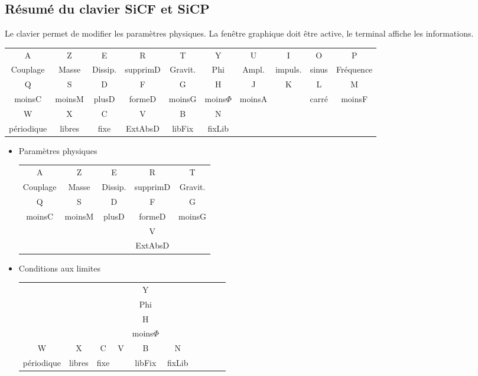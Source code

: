\subsection{Résumé du clavier SiCF et SiCP}
%
Le clavier permet de modifier les paramètres physiques. La fenêtre graphique doit être active, le terminal affiche les informations.
%
%
\footnotesize
\begin{center}
\begin{tabular}{cccccccccc}
\sf A &\sf Z &\sf E &\sf R &\sf T &\sf Y &\sf U &\sf I &\sf O &\sf P \\
Couplage & Masse & Dissip. & supprimD & Gravit. & Phi & Ampl. & impuls. & sinus & Fréquence \\
\sf Q &\sf S &\sf D &\sf F &\sf G &\sf H &\sf J &\sf K &\sf L &\sf M \\
moinsC & moinsM & plusD & formeD & moinsG & moins$\Phi$ & moinsA &  & carré & moinsF \\
\sf W &\sf X &\sf C &\sf V &\sf B &\sf N &  &  &  & \\
périodique & libres & fixe & ExtAbsD & libFix & fixLib &  &  &  & \\
\end{tabular}
\end{center}
\vspace{.3cm}
%
\normalsize
\begin{itemize}[leftmargin=2cm, label=, itemsep=0pt]%
\item Paramètres physiques

\begin{tabular}{ccccc}
\sf A &\sf Z &\sf E &\sf R &\sf T  \\
Couplage & Masse & Dissip. & supprimD & Gravit.  \\
\sf Q &\sf S &\sf D &\sf F &\sf G  \\
moinsC & moinsM & plusD & formeD & moinsG  \\
 & & & \sf V   & \\
 & & & ExtAbsD &  \\
\end{tabular}
%
\end{itemize}
\begin{itemize}[leftmargin=2cm, label=, itemsep=0pt]%
\item Conditions aux limites

\hspace{3cm}
\begin{tabular}{cccccccccc}
 & & & &\sf Y \\
 & & & & Phi \\
 & & & &\sf H \\
 & & & & moins$\Phi$  & & &  & \\
\sf W &\sf X &\sf C &\sf V &\sf B &\sf N  \\
périodique & libres & fixe &  & libFix & fixLib  \\
\end{tabular}
%
\end{itemize}
